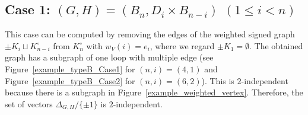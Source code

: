 \documentclass{amsart}
\theoremstyle{definition}
\theoremstyle{remark}
\numberwithin{equation}{section}
\begin{document}
\subsection{Case 1: $(G,H)=(B_{n},D_{i}\times B_{n-i})$ $(1\le i< n)$}
\label{sect:6.1}
This case can be computed by removing the edges of the weighted signed graph $\pm K_{i}\sqcup K_{n-i}^{\circ}$ from $K_{n}^{\circ}$ with $w_{V}(i)=e_{i}$, where we regard $\pm K_{1}=\emptyset$.
The obtained graph has a subgraph of one loop with multiple edge (see Figure~\ref{example_typeB_Case1} for $(n,i)=(4,1)$ and Figure~\ref{example_typeB_Case2} for $(n,i)=(6,2)$).
This is $2$-independent because there is a subgraph in  Figure~\ref{example_weighted_vertex}.
Therefore, the set of vectors $\Delta_{G,H}/\{\pm 1\}$ is $2$-independent.

\end{document}
